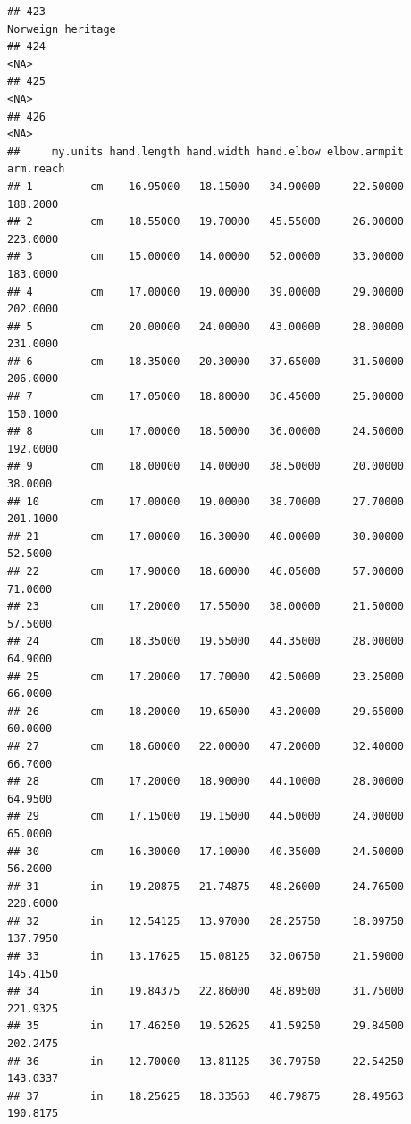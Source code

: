 \documentclass[]{article}
\begin{document}
\begin{verbatim}
## 423                                                                                                                                   Norweign heritage
## 424                                                                                                                                                <NA>
## 425                                                                                                                                                <NA>
## 426                                                                                                                                                <NA>
##     my.units hand.length hand.width hand.elbow elbow.armpit arm.reach
## 1         cm    16.95000   18.15000   34.90000     22.50000  188.2000
## 2         cm    18.55000   19.70000   45.55000     26.00000  223.0000
## 3         cm    15.00000   14.00000   52.00000     33.00000  183.0000
## 4         cm    17.00000   19.00000   39.00000     29.00000  202.0000
## 5         cm    20.00000   24.00000   43.00000     28.00000  231.0000
## 6         cm    18.35000   20.30000   37.65000     31.50000  206.0000
## 7         cm    17.05000   18.80000   36.45000     25.00000  150.1000
## 8         cm    17.00000   18.50000   36.00000     24.50000  192.0000
## 9         cm    18.00000   14.00000   38.50000     20.00000   38.0000
## 10        cm    17.00000   19.00000   38.70000     27.70000  201.1000
## 21        cm    17.00000   16.30000   40.00000     30.00000   52.5000
## 22        cm    17.90000   18.60000   46.05000     57.00000   71.0000
## 23        cm    17.20000   17.55000   38.00000     21.50000   57.5000
## 24        cm    18.35000   19.55000   44.35000     28.00000   64.9000
## 25        cm    17.20000   17.70000   42.50000     23.25000   66.0000
## 26        cm    18.20000   19.65000   43.20000     29.65000   60.0000
## 27        cm    18.60000   22.00000   47.20000     32.40000   66.7000
## 28        cm    17.20000   18.90000   44.10000     28.00000   64.9500
## 29        cm    17.15000   19.15000   44.50000     24.00000   65.0000
## 30        cm    16.30000   17.10000   40.35000     24.50000   56.2000
## 31        in    19.20875   21.74875   48.26000     24.76500  228.6000
## 32        in    12.54125   13.97000   28.25750     18.09750  137.7950
## 33        in    13.17625   15.08125   32.06750     21.59000  145.4150
## 34        in    19.84375   22.86000   48.89500     31.75000  221.9325
## 35        in    17.46250   19.52625   41.59250     29.84500  202.2475
## 36        in    12.70000   13.81125   30.79750     22.54250  143.0337
## 37        in    18.25625   18.33563   40.79875     28.49563  190.8175

\end{verbatim}
\end{document}
